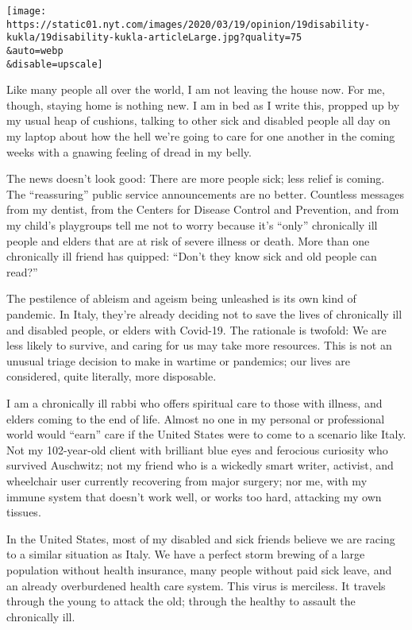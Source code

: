 \texttt{[image: https://static01.nyt.com/images/2020/03/19/opinion/19disability-kukla/19disability-kukla-articleLarge.jpg?quality=75\\\&auto=webp\\\&disable=upscale]}

Like many people all over the world, I am not leaving the house now. For
me, though, staying home is nothing new. I am in bed as I write this,
propped up by my usual heap of cushions, talking to other sick and
disabled people all day on my laptop about how the hell we're going to
care for one another in the coming weeks with a gnawing feeling of dread
in my belly.

The news doesn't look good: There are more people sick; less relief is
coming. The ``reassuring'' public service announcements are no better.
Countless messages from my dentist, from the Centers for Disease Control
and Prevention, and from my child's playgroups tell me not to worry
because it's ``only'' chronically ill people and elders that are at risk
of severe illness or death. More than one chronically ill friend has
quipped: ``Don't they know sick and old people can read?''

The pestilence of ableism and ageism being unleashed is its own kind of
pandemic. In Italy, they're already deciding not to save the lives of
chronically ill and disabled people, or elders with Covid-19. The
rationale is twofold: We are less likely to survive, and caring for us
may take more resources. This is not an unusual triage decision to make
in wartime or pandemics; our lives are considered, quite literally, more
disposable.

I am a chronically ill rabbi who offers spiritual care to those with
illness, and elders coming to the end of life. Almost no one in my
personal or professional world would ``earn'' care if the United States
were to come to a scenario like Italy. Not my 102-year-old client with
brilliant blue eyes and ferocious curiosity who survived Auschwitz; not
my friend who is a wickedly smart writer, activist, and wheelchair user
currently recovering from major surgery; nor me, with my immune system
that doesn't work well, or works too hard, attacking my own tissues.

In the United States, most of my disabled and sick friends believe we
are racing to a similar situation as Italy. We have a perfect storm
brewing of a large population without health insurance, many people
without paid sick leave, and an already overburdened health care system.
This virus is merciless. It travels through the young to attack the old;
through the healthy to assault the chronically ill.

